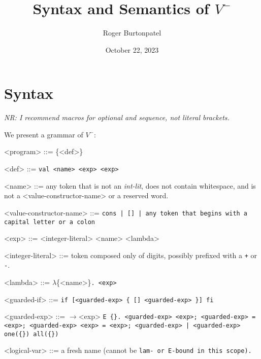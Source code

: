 \documentclass[]{article}
\title{Syntax and Semantics of $V^{-}$}
\author{Roger Burtonpatel}
\date{October 22, 2023}
\newcommand\nr[1]{\leavevmode\emph{NR: #1}}
\begin{document}
\maketitle

\section{Syntax}

\nr{I recommend macros for optional and sequence, not literal brackets.}

We present a grammar of $V^{-}$: 

\bigskip



\begin{grammar}
    <program> ::= \{{<def>}\}
    
    <def> ::= \tt{val} <name> <exp>
        \alt <exp>
    
    <name> ::= any token that is not an \textit{int-lit}, does not contain 
    whitespace,
    and is not a <value-constructor-name> or a reserved word.

    <value-constructor-name> ::= \tt{cons} | \tt{[]} | any token that begins
    with a capital letter or a colon

    <exp> ::= <integer-literal>
        \alt <name>
        \alt <lambda>

    <integer-literal> ::= token composed only of digits, possibly prefixed with a \texttt{+} or \texttt{-}.

    <lambda> ::= $\lambda$\{<name>\}\tt{.} <exp>

    <guarded-if> ::= \tt{if}  [<guarded-exp> \{ [] <guarded-exp> \}] \tt{fi}


    <guarded-exp> ::= $\boldsymbol{\rightarrow}$<exp>
    \alt  \tt{E} \{<logical-var>\}\tt{.} <guarded-exp>
    \alt  <exp>\tt{;} <guarded-exp>
     \tt{=} <exp>\tt{;} <guarded-exp>
    \alt   <exp> \tt{=} <exp>\tt{;} <guarded-exp>
     | <guarded-exp> 
    \alt   \tt{one}(\{<guarded-exp>\})
    \alt   \tt{all}(\{<guarded-exp>\})

    <logical-var> ::= a fresh name (cannot be \tt{lam}- or \tt{E}-bound in
    this scope).

\end{grammar}
\end{document}
